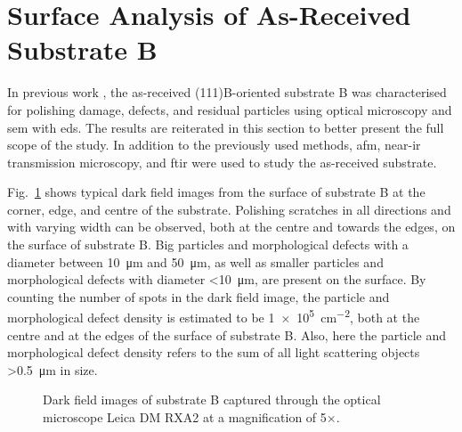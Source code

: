 \clearpage
\section{Surface Analysis of As-Received Substrate B}\label{sec:subBa}
In previous work \citep{lauten2017characterisation}, the as-received (111)B-oriented substrate B was characterised for polishing damage, defects, and residual particles using optical microscopy and \ac{sem} with \ac{eds}. The results are reiterated in this section to better present the full scope of the study. In addition to the previously used methods, \ac{afm}, near-\ac{ir} transmission microscopy, and \ac{ftir} were used to study the as-received substrate.

Fig.~\ref{fig:subBa_om_df} shows typical dark field images from the surface of substrate B at the corner, edge, and centre of the substrate. Polishing scratches in all directions and with varying width can be observed, both at the centre and towards the edges, on the surface of substrate B. Big particles and morphological defects with a diameter between \SI{10}{\micro\metre} and \SI{50}{\micro\metre}, as well as smaller particles and morphological defects with diameter \SI{<10}{\micro\metre}, are present on the surface. By counting the number of spots in the dark field image, the particle and morphological defect density is estimated to be \SI{1e5}{\centi\metre^{-2}}, both at the centre and at the edges of the surface of substrate B. Also, here the particle and morphological defect density refers to the sum of all light scattering objects \SI{>0.5}{\micro\metre} in size.

\begin{figure}[htbp]
    \centering
    \caption[Dark field images of substrate B.]{Dark field images of substrate B captured through the optical microscope Leica DM RXA2 at a magnification of 5$\times$.}
    \label{fig:subBa_om_df}
\end{figure}

